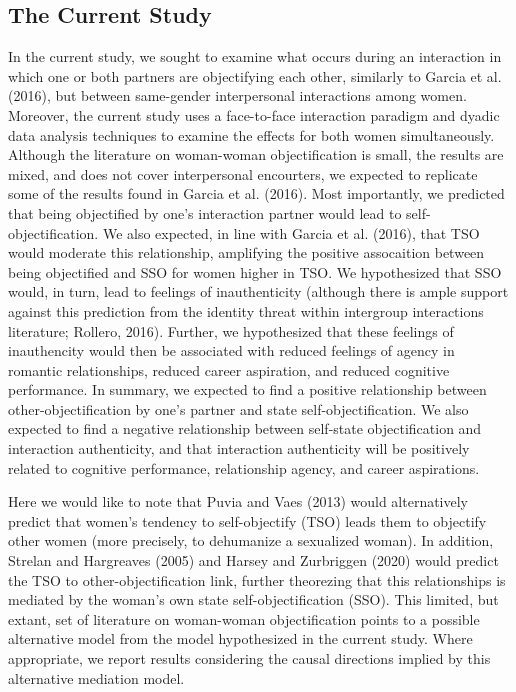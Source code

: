 \documentclass[man]{apa6}
\begin{document}
\subsection{The Current Study}\label{the-current-study}

In the current study, we sought to examine what occurs during an
interaction in which one or both partners are objectifying each other,
similarly to Garcia et al. (2016), but between same-gender interpersonal
interactions among women. Moreover, the current study uses a
face-to-face interaction paradigm and dyadic data analysis techniques to
examine the effects for both women simultaneously. Although the
literature on woman-woman objectification is small, the results are
mixed, and does not cover interpersonal encourters, we expected to
replicate some of the results found in Garcia et al. (2016). Most
importantly, we predicted that being objectified by one's interaction
partner would lead to self-objectification. We also expected, in line
with Garcia et al. (2016), that TSO would moderate this relationship,
amplifying the positive assocaition between being objectified and SSO
for women higher in TSO. We hypothesized that SSO would, in turn, lead
to feelings of inauthenticity (although there is ample support against
this prediction from the identity threat within intergroup interactions
literature; Rollero, 2016). Further, we hypothesized that these feelings
of inauthencity would then be associated with reduced feelings of agency
in romantic relationships, reduced career aspiration, and reduced
cognitive performance. In summary, we expected to find a positive
relationship between other-objectification by one's partner and state
self-objectification. We also expected to find a negative relationship
between self-state objectification and interaction authenticity, and
that interaction authenticity will be positively related to cognitive
performance, relationship agency, and career aspirations.

Here we would like to note that Puvia and Vaes (2013) would
alternatively predict that women's tendency to self-objectify (TSO)
leads them to objectify other women (more precisely, to dehumanize a
sexualized woman). In addition, Strelan and Hargreaves (2005) and Harsey
and Zurbriggen (2020) would predict the TSO to other-objectification
link, further theorezing that this relationships is mediated by the
woman's own state self-objectification (SSO). This limited, but extant,
set of literature on woman-woman objectification points to a possible
alternative model from the model hypothesized in the current study.
Where appropriate, we report results considering the causal directions
implied by this alternative mediation model.
\end{document}
